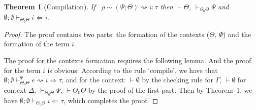 \documentclass[letterpaper, notitlepage]{article}
\newtheorem{theorem}{Theorem}
\begin{document}
\begin{theorem}[Compilation]
If ~$\rho\sim(\Psi;\Theta)\rightsquigarrow i:\tau$ then $\vdash\Theta$, $\vdash_{\Theta_0\Theta}\Psi$ and $\emptyset;\emptyset\vdash_{\Theta_0\Theta} i\Leftarrow\tau$.
\end{theorem}
\begin{proof}
The proof contains two parts: the formation of the contexts ($\Theta$, $\Psi$) and the formation of the term $i$.

The proof for the contexts formation requires the following lemma. And the proof for the term $i$ is obvious: According to the rule `compile', we have that $\emptyset;\emptyset\vdash_{\Theta_0\Theta}^{\Psi}e\rightsquigarrow i\Rightarrow \tau$, and for the context: $\vdash\emptyset$ by the checking rule for $\Gamma$, $\vdash\emptyset$ for context $\Delta$, $\vdash_{\Theta_0\Theta}\Psi$, $\vdash\Theta_0\Theta$ by the proof of the first part. Then by Theorem~1, we have $\emptyset;\emptyset\vdash_{\Theta_0\Theta}i\Leftarrow\tau$, which completes the proof.
\end{proof}
\end{document}
